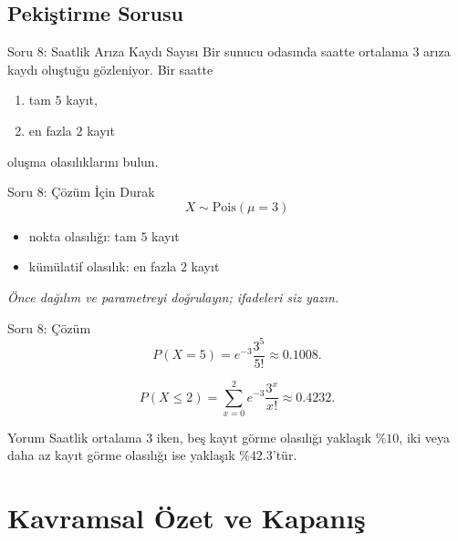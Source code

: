\documentclass[light]{lutbeamer}
\begin{document}
\subsection{Pekiştirme Sorusu}

\begin{frame}{Soru 8: Saatlik Arıza Kaydı Sayısı}
    \small
    Bir sunucu odasında saatte ortalama \(3\) arıza kaydı oluştuğu gözleniyor. Bir saatte
    \begin{enumerate}
        \item[(a)] tam \(5\) kayıt,
        \item[(b)] en fazla \(2\) kayıt
    \end{enumerate}
    oluşma olasılıklarını bulun.
\end{frame}

\begin{frame}{Soru 8: Çözüm İçin Durak}
    \color{red!70!black}
    \small
    \[
    X \sim \text{Pois}(\mu=3)
    \]
    \begin{itemize}
        \item[(a)] nokta olasılığı: tam \(5\) kayıt
        \item[(b)] kümülatif olasılık: en fazla \(2\) kayıt
    \end{itemize}

    \begin{center}
        \textit{Önce dağılım ve parametreyi doğrulayın; ifadeleri siz yazın.}
    \end{center}
\end{frame}

\begin{frame}{Soru 8: Çözüm}
    \small
    \[
    P(X=5)=e^{-3}\frac{3^5}{5!}\approx 0.1008.
    \]

    \[
    P(X\le 2)=\sum_{x=0}^{2} e^{-3}\frac{3^x}{x!}\approx 0.4232.
    \]

    \begin{exampleblock}{Yorum}
        Saatlik ortalama \(3\) iken, beş kayıt görme olasılığı yaklaşık \(\%10\), iki veya daha az kayıt görme olasılığı ise yaklaşık \(\%42.3\)'tür.
    \end{exampleblock}
\end{frame}

\section{Kavramsal Özet ve Kapanış}
\end{document}
